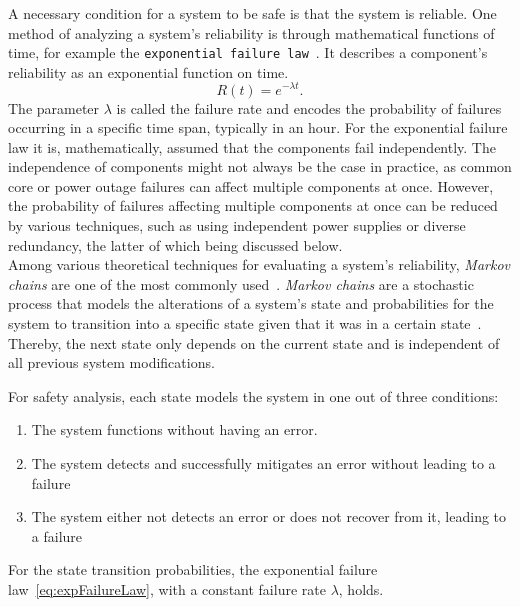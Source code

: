 A necessary condition for a system to be safe is that the system is reliable.
One method of analyzing a system's reliability is through mathematical functions of time, for example the \texttt{exponential failure law}~\cite{GeffroyMotetDependableComputing}.
It describes a component's reliability as an exponential function on time.
\begin{equation}
R(t) = e^{-\lambda t}.
\label{eq:expFailureLaw}
\end{equation}
The parameter $\lambda$ is called the failure rate and encodes the probability of failures occurring in a specific time span, typically in an hour.
For the exponential failure law it is, mathematically, assumed that the components fail independently.
The independence of components might not always be the case in practice, as common core or power outage failures can affect multiple components at once.
However, the probability of failures affecting multiple components at once can be reduced by various techniques, such as using independent power supplies or diverse redundancy, the latter of which being discussed below.
\\

Among various theoretical techniques for evaluating a system's reliability, \textit{Markov chains} are one of the most commonly used~\cite{BarryFaultToleranceAnalysis}.
\textit{Markov chains} are a stochastic process that models the alterations of a system's state and probabilities for the system to transition into a specific state given that it was in a certain state~\cite{KemenyMarkovChains}.
Thereby, the next state only depends on the current state and is independent of all previous system modifications.

For safety analysis, each state models the system in one out of three conditions:
\begin{enumerate}
\item The system functions without having an error.
\item The system detects and successfully mitigates an error without leading to a failure
\item The system either not detects an error or does not recover from it, leading to a failure
\end{enumerate}

For the state transition probabilities, the exponential failure law~\autoref{eq:expFailureLaw}, with a constant failure rate $\lambda$, holds.

